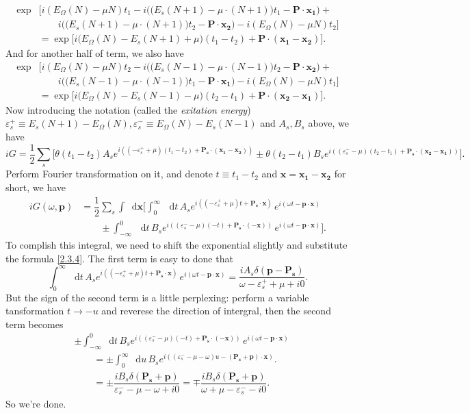 \documentclass[b5paper,10pt,UTF8]{book}
\newcommand*\dd{\mathop{}\!\mathrm{d}}
\numberwithin{equation}{section}
\begin{document}
\begin{Proof}
			\begin{align*}
			\exp&\bigg[i(E_\Omega(N)-\mu N)t_1-i\bigg(\big(E_s(N+1)-\mu\cdot(N+1)\big)t_1-\bm{P\cdot x_1}\bigg)+\\
			&\qquad i\bigg(\big(E_s(N+1)-\mu\cdot(N+1)\big)t_2-\bm{P\cdot x_2}\bigg)-i(E_\Omega(N)-\mu N)t_2\bigg]\\
			&=\exp\bigg[i\bigg(E_\Omega(N)-E_s(N+1)+\mu\bigg)(t_1-t_2)+\bm{P\cdot}(\bm{x_1-x_2})\bigg].
			\end{align*}
			And for another half of term, we also have
			\begin{align*}
			\exp&\bigg[i(E_\Omega(N)-\mu N)t_2-i\bigg(\big(E_s(N-1)-\mu\cdot(N-1)\big)t_2-\bm{P\cdot x_2}\bigg)+\\
			&\qquad i\bigg(\big(E_s(N-1)-\mu\cdot(N-1)\big)t_1-\bm{P\cdot x_1}\bigg)-i(E_\Omega(N)-\mu N)t_1\bigg]\\
			&=\exp\bigg[i\bigg(E_\Omega(N)-E_s(N-1)-\mu\bigg)(t_2-t_1)+\bm{P\cdot}(\bm{x_2-x_1})\bigg].
			\end{align*}
			Now introducing the notation (called the \emph{exitation energy}) $\varepsilon_s^+\equiv E_s(N+1)-E_\Omega(N), \varepsilon_s^-\equiv E_\Omega(N)-E_s(N-1)$ and $A_s, B_s$ above, we have
			$$iG=\dfrac{1}{2}\sum_s\bigg[\theta(t_1-t_2)A_s e^{i((-\varepsilon_s^+ +\mu)(t_1-t_2)+\bm{P_s\cdot}(\bm{x_1-x_2}))}\pm\theta(t_2-t_1)B_s e^{i((\varepsilon_s^--\mu)(t_2-t_1)+\bm{P_s\cdot}(\bm{x_2-x_1}))}\bigg].$$
			Perform Fourier transformation on it, and denote $t\equiv t_1-t_2$ and $\bm{x}=\bm{x_1}-\bm{x_2}$ for short, we have
			\begin{align*}
				iG(\omega,\bm{p})&=\dfrac{1}{2}\sum_s\int\dd\bm{x}\bigg[\int_0^\infty\,\dd t\,A_s e^{i((-\varepsilon_s^+ +\mu)t+\bm{P_s\cdot x})}\,e^{i(\omega t-\bm{p\cdot x})}\\
				&\qquad\pm\int_{-\infty}^0\,\dd t\,	B_s e^{i((\varepsilon_s^--\mu)(-t)+\bm{P_s\cdot(-x)})}\,e^{i(\omega t-\bm{p\cdot x})}\bigg].
			\end{align*}
			To complish this integral, we need to shift the exponential slightly and substitute the formula \eqref{2.3.4}. The first term is easy to done that
			$$\int_0^\infty\,\dd t\,A_s e^{i((-\varepsilon_s^+ +\mu)t+\bm{P_s\cdot x})}\,e^{i(\omega t-\bm{p\cdot x})}=\dfrac{iA_s\delta(\bm{p}-\bm{P_s})}{\omega-\varepsilon_s^+ +\mu +i0}.$$
			But the sign of the second term is a little perplexing: perform a variable tansformation $t\rightarrow-u$ and reverese the direction of intergral, then the second term becomes
			\begin{align*}
			&\pm\int_{-\infty}^0\dd t\,B_s e^{i((\varepsilon_s^--\mu)(-t)+\bm{P_s\cdot(-x)})}\,e^{i(\omega t-\bm{p\cdot x})}\\
			&\qquad=\pm\int_0^\infty\dd u\, B_s e^{i( (\varepsilon_s^- -\mu-\omega)u-\bm{(P_s+p)\cdot x})}.\\
			&\qquad=\pm\dfrac{iB_s\delta(\bm{P_s}+\bm{p})}{\varepsilon_s^- -\mu-\omega+i0}=\mp\dfrac{iB_s\delta(\bm{P_s}+\bm{p})}{\omega+\mu-\varepsilon_s^- -i0}.
			\end{align*}
			So we're done.
		\end{Proof}
\end{document}
